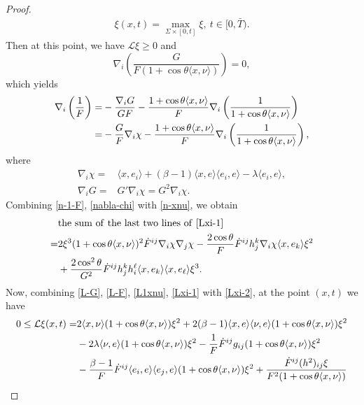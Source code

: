 \documentclass[11pt,reqno]{amsart}
\theoremstyle{definition}
\theoremstyle{remark}
\numberwithin{equation}{section}
\renewcommand{\(}{\left(}
\renewcommand{\)}{\right)}
\renewcommand{\-}{\overline}
\begin{document}
\begin{proof}
\begin{align*}
	\xi(x,t)=\max_{\Sigma\times[0,t]}\xi, \ t\in[0,\bar{T}).
\end{align*} 
Then at this  point, we have $\mathcal{L}\xi\geq 0$ and
\begin{equation*}
	\nabla_i\left(\frac{G}{F(1+\cos\theta\langle x,\nu \rangle)}\right)=0,
\end{equation*}
which yields
\begin{align}
	\nabla_i\left(\frac{1}{F}\right)=&-\frac{\nabla_i G}{GF}-\frac{1+\cos\theta\langle x,\nu \rangle}{F}\nabla_i\left(\frac{1}{1+\cos\theta\langle x,\nu \rangle}\right)\notag\\
	=&-\frac{G}{F}\nabla_i{\chi}-\frac{1+\cos\theta\langle x,\nu \rangle}{F}\nabla_i\left(\frac{1}{1+\cos\theta\langle x,\nu \rangle}\right),\label{n-1-F}
\end{align}
where 
\begin{align}
	\nabla_i{\chi}=&\langle x,e_i\rangle+(\beta-1)\langle x,e\rangle \langle e_i,e\rangle-\lambda \langle e_i,e\rangle,\label{nabla-chi}\\
	\nabla_i G=&G'\nabla_i\chi=G^2\nabla_i\chi.\label{nabla-G}
\end{align}
Combining \eqref{n-1-F}, \eqref{nabla-chi} with \eqref{n-xnu}, we obtain
\begin{align}
	&\mathrm{the\,\,sum \,\,of\,\, the\,\, last\,\, two \,\,lines\,\, of\,\,\eqref{Lxi-1}}\nonumber\\
 =&2\xi^3(1+\cos\theta\langle x,\nu \rangle)^2\dot{F}^{ij}\nabla_i\chi \nabla_j \chi-\frac{2\cos\theta}{F}\dot{F}^{ij}h_j^k\nabla_i{\chi}\langle x,e_k\rangle\xi^2\notag\\
	&+\frac{2\cos^2\theta}{G^2}\dot{F}^{ij}h_j^k h_i^{\ell}\langle x,e_k\rangle\langle x,e_{\ell}\rangle\xi^3.\label{Lxi-2}
\end{align}
Now, combining \eqref{L-G}, \eqref{L-F}, \eqref{L1xnu}, \eqref{Lxi-1} with \eqref{Lxi-2}, at the point $(x,t)$ we have
\begin{align}
	0\leq\mathcal{L}{\xi}(x,t)=&2\langle x,\nu\rangle(1+\cos\theta\langle x,\nu \rangle)\xi^2+2(\beta-1)\langle x,e\rangle\langle\nu,e \rangle(1+\cos\theta\langle x,\nu \rangle)\xi^2\notag\\
	&-2\lambda\langle\nu,e \rangle(1+\cos\theta\langle x,\nu \rangle)\xi^2-\frac{1}{F}\dot{F}^{ij}g_{ij}(1+\cos\theta\langle x,\nu \rangle)\xi^2\notag\\
	&-\frac{\beta-1}{F}\dot{F}^{ij}\langle e_i,e\rangle \langle e_j,e\rangle(1+\cos\theta\langle x,\nu \rangle)\xi^2+\frac{\dot{F}^{ij}(h^2)_{ij}\xi}{F^2(1+\cos\theta\langle x,\nu \rangle)}\notag\\

\end{align}
\end{proof}
\end{document}
